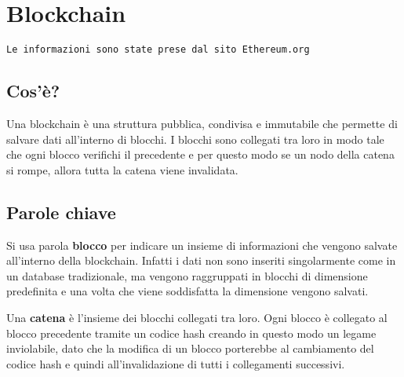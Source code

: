 \chapter{Blockchain}
\texttt{Le informazioni sono state prese dal sito Ethereum.org}\cite{ethereumDocumentiation}
\label{cha:blockchain}

\section{Cos'è?}
Una blockchain è una struttura pubblica, condivisa e immutabile che permette di
salvare dati all'interno di blocchi. I blocchi sono collegati tra loro in modo
tale che ogni blocco verifichi il precedente e per questo modo se un nodo della
catena si rompe, allora tutta la catena viene invalidata.

\section{Parole chiave}
Si usa parola \textbf{blocco} per indicare un insieme di informazioni che
vengono salvate all'interno della blockchain. Infatti i dati non sono inseriti
singolarmente come in un database tradizionale, ma vengono raggruppati in
blocchi di dimensione predefinita e una volta che viene soddisfatta la
dimensione vengono salvati.

Una \textbf{catena} è l'insieme dei blocchi collegati tra loro. Ogni blocco è 
collegato al blocco precedente tramite un codice hash creando in questo modo
un legame inviolabile, dato che la modifica di un blocco porterebbe al 
cambiamento del codice hash e quindi all'invalidazione di tutti i collegamenti
successivi.

